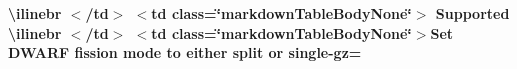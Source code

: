 \begin{longtabu}
{\bfseries{{\ttfamily \textbackslash{}ilinebr \texorpdfstring{$<$}{<}/td\texorpdfstring{$>$}{>} \texorpdfstring{$<$}{<}td class=\char`\"{}markdown\+Table\+Body\+None\char`\"{}\texorpdfstring{$>$}{>} Supported \textbackslash{}ilinebr \texorpdfstring{$<$}{<}/td\texorpdfstring{$>$}{>} \texorpdfstring{$<$}{<}td class=\char`\"{}markdown\+Table\+Body\+None\char`\"{}\texorpdfstring{$>$}{>}}Set DWARF fission mode to either \textquotesingle{}split\textquotesingle{} or \textquotesingle{}single-\/gz=}}


\end{longtabu}
